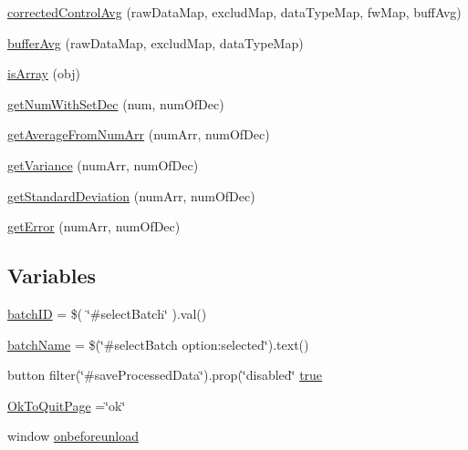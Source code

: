 \begin{DoxyCompactItemize}
\hyperlink{obsolete_2processing__bak_8php_a337ef7b1f2fafd4649ea5645080c6356}{corrected\-Control\-Avg} (raw\-Data\-Map, exclud\-Map, data\-Type\-Map, fw\-Map, buff\-Avg)
\item 
\hyperlink{obsolete_2processing__bak_8php_add23382310b9fc9672ec70ac21671322}{buffer\-Avg} (raw\-Data\-Map, exclud\-Map, data\-Type\-Map)
\item 
\hyperlink{obsolete_2processing__bak_8php_aa5fb5998ccfcfe9ce6953516b6e3bcb1}{is\-Array} (obj)
\item 
\hyperlink{obsolete_2processing__bak_8php_afceb7af57b26aecce1a9296d71bfaafe}{get\-Num\-With\-Set\-Dec} (num, num\-Of\-Dec)
\item 
\hyperlink{obsolete_2processing__bak_8php_ae0305f1551770d6a7e38511bc122b8d0}{get\-Average\-From\-Num\-Arr} (num\-Arr, num\-Of\-Dec)
\item 
\hyperlink{obsolete_2processing__bak_8php_a624f45bf85d91531932db89ec727cc55}{get\-Variance} (num\-Arr, num\-Of\-Dec)
\item 
\hyperlink{obsolete_2processing__bak_8php_a79058dbb19f8820281238eabeddec077}{get\-Standard\-Deviation} (num\-Arr, num\-Of\-Dec)
\item 
\hyperlink{obsolete_2processing__bak_8php_a3ac0127239c94d2495075c0f66556d7e}{get\-Error} (num\-Arr, num\-Of\-Dec)
\end{DoxyCompactItemize}
\subsection*{Variables}
\begin{DoxyCompactItemize}
\item 
\hyperlink{obsolete_2processing__bak_8php_a88c5bc4262b7c34f236357f5c53fc99b}{batch\-I\-D} = \$( \char`\"{}\#select\-Batch\char`\"{} ).val()
\item 
\hyperlink{obsolete_2processing__bak_8php_aacb4c47c97ff6a475764ba2cf4090a32}{batch\-Name} = \$(\char`\"{}\#select\-Batch option\-:selected\char`\"{}).text()
\item 
button filter(\char`\"{}\#save\-Processed\-Data\char`\"{}).prop(\char`\"{}disabled\char`\"{} \hyperlink{obsolete_2processing__bak_8php_ad85b26c88897c4f65b1a4930711a2e93}{true}
\item 
\hyperlink{obsolete_2processing__bak_8php_a737a9dd58b5139e64ee8903b481e9aa8}{Ok\-To\-Quit\-Page} =\char`\"{}ok\char`\"{}
\item 
window \hyperlink{obsolete_2processing__bak_8php_a12dd03abd8fa9daa2fe8eaeb9c9682c3}{onbeforeunload}
\end{DoxyCompactItemize}


